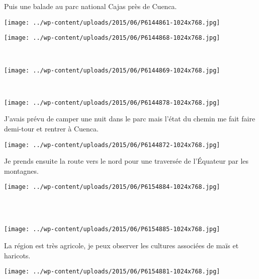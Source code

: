 Puis une balade au parc national Cajas près de Cuenca. 
\vspace{-1.25mm}
\begin{center} \texttt{[image: ../wp-content/uploads/2015/06/P6144861-1024x768.jpg]} \end{center}
\vfill
\begin{center} \texttt{[image: ../wp-content/uploads/2015/06/P6144868-1024x768.jpg]} \end{center}
\vspace{-\topsep}
\vspace{-0.75mm}
\pagebreak
~\\
\begin{center} \texttt{[image: ../wp-content/uploads/2015/06/P6144869-1024x768.jpg]} \end{center}
~\\
\begin{center} \texttt{[image: ../wp-content/uploads/2015/06/P6144878-1024x768.jpg]} \end{center}
\vspace{-\topsep}
\pagebreak

J'avais prévu de camper une nuit dans le parc mais l'état du chemin me fait faire demi-tour et rentrer à Cuenca. 
\begin{center} \texttt{[image: ../wp-content/uploads/2015/06/P6144872-1024x768.jpg]} \end{center}

Je prends ensuite la route vers le nord pour une traversée de l'Équateur par les montagnes. 
\begin{center} \texttt{[image: ../wp-content/uploads/2015/06/P6154884-1024x768.jpg]} \end{center}
\vspace{-\topsep}
\pagebreak
~\\
~\\
\vspace{3.25mm}
\begin{center} \texttt{[image: ../wp-content/uploads/2015/06/P6154885-1024x768.jpg]} \end{center}

La région est très agricole, je peux observer les cultures associées de maïs et haricots. 
\begin{center} \texttt{[image: ../wp-content/uploads/2015/06/P6154881-1024x768.jpg]} \end{center}
\vspace{-\topsep}
\pagebreak

